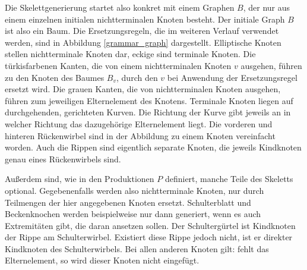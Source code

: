Die Skelettgenerierung startet also konkret mit einem Graphen $B$, der nur aus einem einzelnen initialen nichtterminalen Knoten besteht. Der initiale Graph $B$ ist also ein Baum.
Die Ersetzungsregeln, die im weiteren Verlauf verwendet werden, sind in Abbildung \ref{grammar_graph} dargestellt. 
Elliptische Knoten stellen nichtterminale Knoten dar, eckige sind terminale Knoten. Die türkisfarbenen Kanten, die von einem nichtterminalen Knoten $v$ ausgehen, führen zu den Knoten des Baumes $B_v$, durch den $v$ bei Anwendung der Ersetzungsregel ersetzt wird. Die grauen Kanten, die von nichtterminalen Knoten ausgehen, führen zum jeweiligen Elternelement des Knotens. Terminale Knoten liegen auf durchgehenden, gerichteten Kurven. Die Richtung der Kurve gibt jeweils an in welcher Richtung das dazugehörige Elternelement liegt.
Die vorderen und hinteren Rückenwirbel sind in der Abbildung zu einem Knoten vereinfacht worden. Auch die Rippen sind eigentlich separate Knoten, die jeweils Kindknoten genau eines Rückenwirbels sind.

Außerdem sind, wie in den Produktionen $P$ definiert, manche Teile des Skeletts optional. Gegebenenfalls werden also nichtterminale Knoten, nur durch Teilmengen der hier angegebenen Knoten ersetzt. Schulterblatt und Beckenknochen werden beispielweise nur dann generiert, wenn es auch Extremitäten gibt, die daran ansetzen sollen. Der Schultergürtel ist Kindknoten der Rippe am Schulterwirbel. Existiert diese Rippe jedoch nicht, ist er direkter Kindknoten des Schulterwirbels. Bei allen anderen Knoten gilt: fehlt das Elternelement, so wird dieser Knoten nicht eingefügt.

